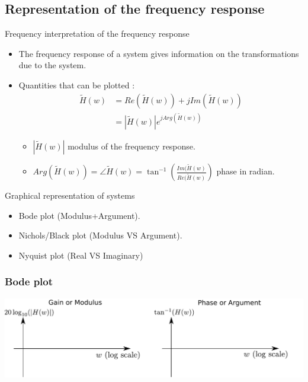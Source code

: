     
    \subsection{Representation of the frequency response}
    \begin{block}{Frequency interpretation of the frequency response}
      \begin{itemize}
      \item The frequency response of a system gives information on the transformations due to the system.
      \item Quantities that can be plotted :
  \begin{align*}
    \tilde H(w)&= Re(\tilde H(w))+jIm(\tilde H(w))\\
  &=|\tilde H(w)|e^{jArg(\tilde H(w))}
  \end{align*}
  \vspace{-5mm}
  \begin{itemize}
  \item $|\tilde H(w)|$ modulus of the frequency response.
  \item $Arg(\tilde H(w))=\angle
  \tilde H(w)=\tan^{-1}\left(\frac{Im(\tilde H(w)}{Re(\tilde H(w)}\right)$ phase in radian.
  \end{itemize}
  
      \end{itemize}
    \end{block}
    \begin{exampleblock}{Graphical representation of systems}
      \begin{itemize}
      \item Bode plot (Modulus+Argument).
      \item Nichols/Black plot (Modulus VS Argument).
      \item Nyquist plot (Real VS Imaginary)
      \end{itemize}
    \end{exampleblock}



    \frametitle{Bode plot}

    \begin{center}
      \includegraphics[width=\linewidth]{imgs/fourier/diagramme_bode}
    \end{center}
    
